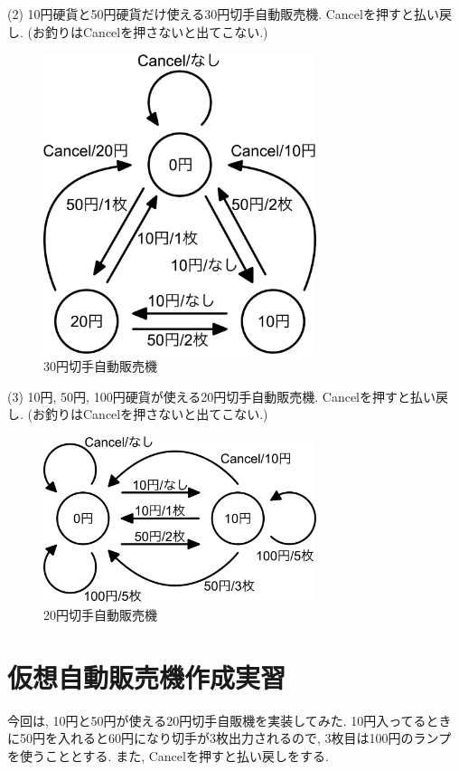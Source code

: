 \documentclass[titlepage]{jsarticle}
\begin{document}
    (2) 10円硬貨と50円硬貨だけ使える30円切手自動販売機. Cancelを押すと払い戻し.
    (お釣りはCancelを押さないと出てこない.)

    \begin{figure}[ht]
        \centering
        \includegraphics[width=8cm]{images/30.pdf}
        \caption{30円切手自動販売機}
        \label{fig:30状態遷移図}
    \end{figure}

    (3) 10円, 50円, 100円硬貨が使える20円切手自動販売機. Cancelを押すと払い戻し.
    (お釣りはCancelを押さないと出てこない.)

    \begin{figure}[ht]
        \centering
        \includegraphics[width=8cm]{images/20.pdf}
        \caption{20円切手自動販売機}
        \label{fig:20状態遷移図}
    \end{figure}

\section{仮想自動販売機作成実習}
    今回は, 10円と50円が使える20円切手自販機を実装してみた.
    10円入ってるときに50円を入れると60円になり切手が3枚出力されるので,
    3枚目は100円のランプを使うこととする.
    また, Cancelを押すと払い戻しをする.
\end{document}
